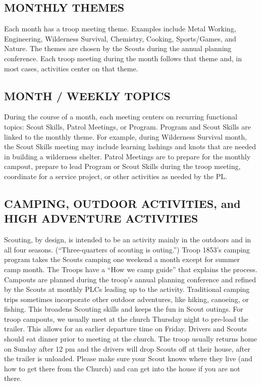 \documentclass{ltxguide}
\begin{document}
\subsection{MONTHLY THEMES}
Each month has a troop meeting theme. Examples include Metal Working, Engineering, Wilderness Survival, Chemistry, Cooking, Sports/Games, and Nature. The themes are chosen by the Scouts during the annual planning conference. Each troop meeting during the month follows that theme and, in most cases, activities center on that theme.

\subsection{MONTH / WEEKLY TOPICS}
During the course of a month, each meeting centers on recurring functional topics: Scout Skills, Patrol Meetings, or Program. Program and Scout Skills are linked to the monthly theme. For example, during Wilderness Survival month, the Scout Skills meeting may include learning lashings and knots that are needed in building a wilderness shelter. Patrol Meetings are to prepare for the monthly campout, prepare to lead Program or Scout Skills during the troop meeting, coordinate for a service project, or other activities as needed by the \ac{PL}.

\subsection{CAMPING, OUTDOOR ACTIVITIES, and HIGH ADVENTURE ACTIVITIES}
Scouting, by design, is intended to be an activity mainly in the outdoors and in all four seasons. (“Three-quarters of scouting is outing.”) Troop 1853's camping program takes the Scouts camping one weekend a month except for summer camp month. 
The Troops have a “How we camp guide” that explains the process. 
Campouts are planned during the troop's annual planning conference and refined by the Scouts at monthly \acp{PLC} leading up to the activity. Traditional camping trips sometimes incorporate other outdoor adventures, like hiking, canoeing, or fishing. This broadens Scouting skills and keeps the fun in Scout outings. For troop campouts, we usually meet at the church Thursday night to pre-load the trailer. This allows for an earlier departure time on Friday. Drivers and Scouts should eat dinner prior to meeting at the  church. The troop usually returns home on Sunday after 12 pm and the drivers will drop Scouts    off at their house, after the trailer is unloaded. Please make sure your Scout knows where they live (and how to get there from the Church) and can get into the house if you are not there.
\end{document}
